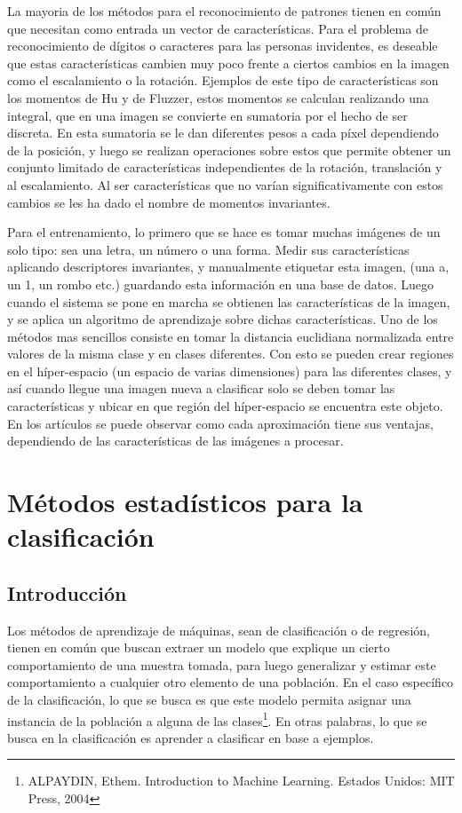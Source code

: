 \documentclass[a4paper, 11pt, oneside]{report}
\begin{document}
La  mayoria de los métodos para el reconocimiento de patrones tienen en común que necesitan como entrada un vector de características. Para el problema de reconocimiento de dígitos o caracteres para las personas invidentes, es deseable que estas características cambien muy poco frente a ciertos cambios en la imagen como el escalamiento o la rotación. Ejemplos de este tipo de características son los momentos de Hu y de Fluzzer, estos momentos se calculan realizando una integral, que en una imagen se convierte en sumatoria por el hecho de ser discreta. En esta sumatoria se le dan diferentes pesos a cada píxel dependiendo de la posición, y luego se realizan operaciones sobre estos que permite obtener un conjunto limitado de características independientes de la rotación, translación y al escalamiento. Al ser características que no varían significativamente con estos  cambios se les ha dado el nombre de momentos invariantes.

Para el entrenamiento, lo primero que se hace es tomar muchas imágenes de un solo tipo: sea una letra, un  número o una forma. Medir sus características aplicando descriptores invariantes, y manualmente  etiquetar esta imagen, (una a, un 1, un rombo etc.) guardando esta información en una base de datos. Luego cuando el sistema se pone en marcha se obtienen las características de la imagen, y se aplica un algoritmo de aprendizaje sobre dichas características. Uno de los métodos mas sencillos consiste en tomar la distancia euclidiana normalizada entre valores de la misma clase y en clases diferentes. Con esto se pueden crear regiones en el híper-espacio (un espacio de varias dimensiones) para las diferentes clases, y así cuando llegue una imagen nueva a clasificar solo se deben tomar las características y ubicar en que región del híper-espacio se encuentra este objeto. En los artículos se puede observar como   cada aproximación tiene sus ventajas, dependiendo de las características de las imágenes a procesar.
    
    
\chapter{Métodos estadísticos para la clasificación}
\label{chap:ml}

\section{Introducción}

Los métodos de aprendizaje de máquinas, sean de clasificación o de regresión, tienen en común que buscan extraer un modelo que explique un cierto comportamiento de una muestra tomada, para luego generalizar y estimar este comportamiento a cualquier otro elemento de una población. En el caso específico de la clasificación, lo que se busca es que este modelo permita asignar una instancia de la población a alguna de las clases\footnote{ALPAYDIN, Ethem. Introduction to Machine Learning. Estados Unidos: MIT Press, 2004}. En otras palabras, lo que se busca en la clasificación es aprender a clasificar en base a ejemplos.
\end{document}
